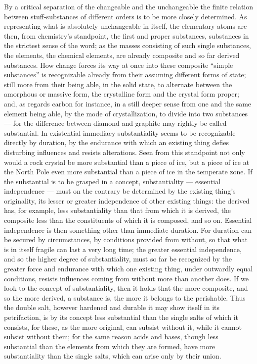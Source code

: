 \documentclass[12pt,a4paper]{book}
\begin{document}
By a critical separation of the changeable and the unchangeable the finite
relation between stuff-substances of different orders is to be more closely
determined. As representing what is absolutely unchangeable in itself, the
elementary atoms are then, from chemistry's standpoint, the first and proper
substances, substances in the strictest sense of the word; as the masses
consisting of such single substances, the elements, the chemical elements, are
already composite and so far derived substances. How change forces its way at
once into these composite ``simple substances'' is recognizable already from
their assuming different forms of state; still more from their being able, in
the solid state, to alternate between the amorphous or massive form, the
crystalline form and the crystal form proper; and, as regards carbon for
instance, in a still deeper sense from one and the same element being able, by
the mode of crystallization, to divide into two substances --- for the
difference between diamond and graphite may rightly be called substantial.
In existential immediacy substantiality seems to be recognizable directly by
duration, by the endurance with which an existing thing defies disturbing
influences and resists alterations. Seen from this standpoint not only would a
rock crystal be more substantial than a piece of ice, but a piece of ice at the
North Pole even more substantial than a piece of ice in the temperate zone. If
the substantial is to be grasped in a concept, substantiality --- essential
independence --- must on the contrary be determined by the existing thing's
originality, its lesser or greater independence of other existing things: the
derived has, for example, less substantiality than that from which it is
derived, the composite less than the constituents of which it is composed, and
so on. Essential independence is then something other than immediate duration.
For duration can be secured by circumstances, by conditions provided from
without, so that what is in itself fragile can last a very long time; the
greater essential independence, and so the higher degree of substantiality,
must so far be recognized by the greater force and endurance with which one
existing thing, under outwardly equal conditions, resists influences coming
from without more than another does. If we look to the concept of
substantiality, then it holds that the more composite, and so the more derived,
a substance is, the more it belongs to the perishable. Thus the double salt,
however hardened and durable it may show itself in its petrifaction, is by its
concept less substantial than the single salts of which it consists, for these,
as the more original, can subsist without it, while it cannot subsist without
them; for the same reason acids and bases, though less substantial than the
elements from which they are formed, have more substantiality than the single
salts, which can arise only by their union.
\end{document}
